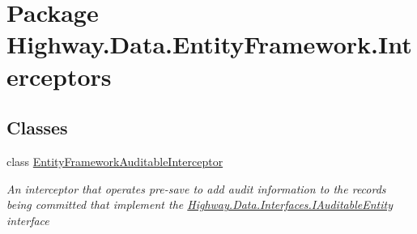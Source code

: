 \hypertarget{namespace_highway_1_1_data_1_1_entity_framework_1_1_interceptors}{\section{Package Highway.\-Data.\-Entity\-Framework.\-Interceptors}
\label{namespace_highway_1_1_data_1_1_entity_framework_1_1_interceptors}
}
\subsection*{Classes}
\begin{DoxyCompactItemize}
\item 
class \hyperlink{class_highway_1_1_data_1_1_entity_framework_1_1_interceptors_1_1_entity_framework_auditable_interceptor}{Entity\-Framework\-Auditable\-Interceptor}
\begin{DoxyCompactList}\small\item\em An interceptor that operates pre-\/save to add audit information to the records being committed that implement the \hyperlink{interface_highway_1_1_data_1_1_interfaces_1_1_i_auditable_entity}{Highway.\-Data.\-Interfaces.\-I\-Auditable\-Entity} interface \end{DoxyCompactList}\end{DoxyCompactItemize}
